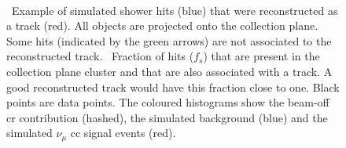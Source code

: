 \begin{figure}[]
\centering
{} \quad\quad
{} \\ 
\caption[Distribution of Fraction of Used Hits in Clusters]{\protect{}~Example of simulated shower hits (blue) that were reconstructed as a track (red). All objects are projected onto the collection plane. Some hits (indicated by the green arrows) are not associated to the reconstructed track. 
\protect{}~Fraction of hits ($f_s$) that are present in the collection plane cluster and that are also associated with a track. A good reconstructed track would have this fraction close to one. Black points are data points. The coloured histograms show the beam-off \acrshort{cr} contribution (hashed), the simulated background (blue) and the simulated $\nu_\mu$ \acrshort{cc} signal events (red).}
\label{fig:aa_trk_quality_frac_used_hits}
\end{figure}






